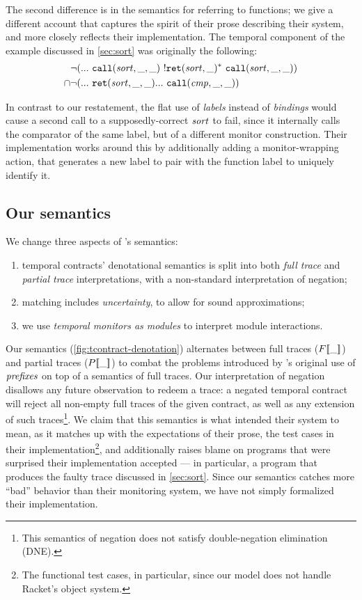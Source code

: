 The second difference is in the semantics for referring to functions; we give a different account that captures the spirit of their prose describing their system, and more closely reflects their implementation.
%
The temporal component of the example discussed in \autoref{sec:sort} was originally the following:
\begin{align*}
 &\neg ({\tt ...}~ {\tt call}(\mathit{sort},\_,\_)~ {}! {\tt ret}(\mathit{sort},\_)^*~ {\tt call}(\mathit{sort},\_,\_)) 
 \\ \cap& \neg ({\tt ...}~ {\tt ret}(\mathit{sort},\_,\_) {\tt ...}~ {\tt call}(\mathit{cmp},\_,\_))
\end{align*}

In contrast to our restatement, the flat use of \emph{labels} instead of \emph{bindings} would cause a second call to a supposedly-correct $\mathit{sort}$ to fail, since it internally calls the comparator of the same label, but of a different monitor construction.
%
Their implementation works around this by additionally adding a monitor-wrapping action, that generates a new label to pair with the function label to uniquely identify it.

\subsection{Our semantics}
%
We change three aspects of \dfm's semantics:
\begin{enumerate}
  \item{temporal contracts' denotational semantics is split into both \emph{full trace} and \emph{partial trace} interpretations, with a non-standard interpretation of negation;}
  \item{matching includes \emph{uncertainty}, to allow for sound approximations;}
  \item{we use \emph{temporal monitors as modules} to interpret module interactions.}
\end{enumerate}
%

%
Our semantics (\autoref{fig:tcontract-denotation}) alternates between full traces ($F[\![ \_ ]\!]$) and partial traces ($P[\![ \_ ]\!]$) to combat the problems introduced by \dfm's original use of $\mathit{prefixes}$ on top of a semantics of full traces.
%
Our interpretation of negation disallows any future observation to redeem a trace: a negated temporal contract will reject all non-empty full traces of the given contract, as well as any extension of such traces\footnote{This semantics of negation does not satisfy double-negation elimination (DNE).}.
%
We claim that this semantics is what \dfm{} intended their system to mean, as it matches up with the expectations of their prose, the test cases in their implementation\footnote{The functional test cases, in particular, since our model does not handle Racket's object system.}, and additionally raises blame on programs that \dfm{} were surprised their implementation accepted --- in particular, a program that produces the faulty trace discussed in \autoref{sec:sort}.
%
Since our semantics catches more ``bad'' behavior than their monitoring system, we have not simply formalized their implementation.

